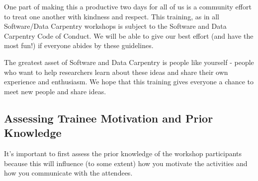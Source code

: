 One part of making this a productive two days for all of us is a
community effort to treat one another with kindness and respect.  This
training, as in all Software/Data Carpentry workshops is subject to
the Software and Data Carpentry Code of Conduct.  We will be able to give our
best effort (and have the most fun!) if everyone abides by these guidelines.

The greatest asset of Software and
Data Carpentry is people like yourself - people who want to help
researchers learn about these ideas and share their own experience
and enthusiasm.  We hope that this training gives everyone a chance to
meet new people and share ideas.

\subsection*{Assessing Trainee Motivation and Prior Knowledge}

It’s important to first assess the prior knowledge of the workshop
participants because this will influence (to some extent) how you
motivate the activities and how you communicate with the attendees.

